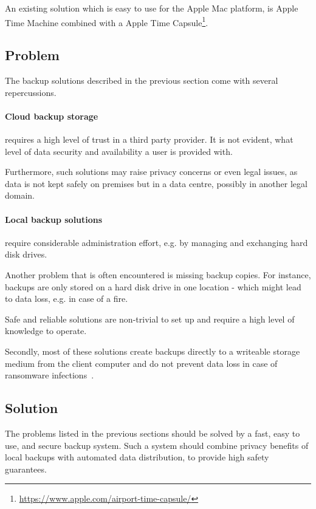 An existing solution which is easy to use for the Apple Mac platform, is Apple Time Machine combined with a Apple Time Capsule\footnote{\url{https://www.apple.com/airport-time-capsule/}}.


\subsection{Problem}
The backup solutions described in the previous section come with several repercussions.

\paragraph{Cloud backup storage} requires a high level of trust in a third party provider. It is not evident, what level of data security and availability a user is provided with.

Furthermore, such solutions may raise privacy concerns or even legal issues, as data is not kept safely on premises but in a data centre, possibly in another legal domain.

\paragraph{Local backup solutions} require considerable administration effort, e.g. by managing and exchanging hard disk drives.

Another problem that is often encountered is missing backup copies. For instance, backups are only stored on a hard disk drive in one location - which might lead to data loss, e.g. in case of a fire.

Safe and reliable solutions are non-trivial to set up and require a high level of knowledge to operate.

Secondly, most of these solutions create backups directly to a writeable storage medium from the client computer and do not prevent data loss in case of ransomware infections~\cite{young-cryptovirology}.

\subsection{Solution}

The problems listed in the previous sections should be solved by a fast, easy to use, and secure backup system. Such a system should combine privacy benefits of local backups with automated data distribution, to provide high safety guarantees.

